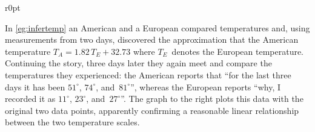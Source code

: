 \begin{wrapfigure}[8]r{0pt}
\end{wrapfigure}
\begin{example} \label{eg:infertemp2}
In \cref{eg:infertemp} an American and a European compared temperatures and, using measurements from two days, discovered the approximation that the American temperature \(T_A=1.82\,T_E+32.73\) where \(T_E\)~denotes the European temperature.
Continuing the story, three days later they again meet and compare the temperatures they experienced: the American reports that ``for the last three days it has been \(51^\circ\), \(74^\circ\), and~\(81^\circ\)'', whereas the European reports ``why, I recorded it as \(11^\circ\), \(23^\circ\), and~\(27^\circ\)''.
The graph to the right plots this data with the original two data points, apparently confirming a reasonable linear relationship between the two temperature scales.


\end{example}
